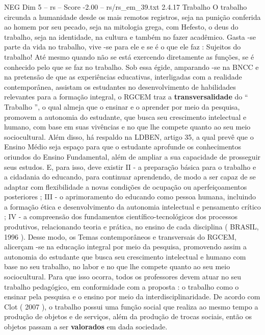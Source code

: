 \begin{textsample}{NEG Dim 5 – rs – Score -2.00 – rs/rs\_em\_39.txt}  \label{ex:f5_neg_023}
2.4.17 Trabalho O trabalho circunda a humanidade desde os mais remotos registros, seja na punição conferida ao homem por seu pecado, seja na mitologia grega, com Hefesto, o deus do trabalho, seja na identidade, na cultura e também no fazer acadêmico.
Gasta -se parte da vida no trabalho, vive -se para ele e se é o que ele faz : Sujeitos do trabalho!
Até mesmo quando não se está exercendo diretamente as funções, se é conhecido pelo que se faz no trabalho.
Sob essa égide, amparando -se na BNCC e na pretensão de que as experiências educativas, interligadas com a realidade contemporânea, assistam os estudantes no desenvolvimento de habilidades relevantes para a formação integral, o RGCEM traz a \textbf{transversalidade} do “ Trabalho ”, o qual almeja que o ensinar e o aprender por meio da pesquisa, promovem a autonomia do estudante, que busca seu crescimento intelectual e humano, com base em suas vivências e no que lhe compete quanto ao seu meio sociocultural.
Além disso, há respaldo na LDBEN, artigo 35, a qual prevê que o Ensino Médio seja espaço para que o estudante aprofunde os conhecimentos oriundos do Ensino Fundamental, além de ampliar a sua capacidade de prosseguir seus estudos.
E, para isso, deve existir II - a preparação básica para o trabalho e a cidadania do educando, para continuar aprendendo, de modo a ser capaz de se adaptar com flexibilidade a novas condições de ocupação ou aperfeiçoamentos posteriores ; III - o aprimoramento do educando como pessoa humana, incluindo a formação ética e desenvolvimento da autonomia intelectual e pensamento crítico ; IV - a compreensão dos fundamentos científico-tecnológicos dos processos produtivos, relacionando teoria e prática, no ensino de cada disciplina ( BRASIL, 1996 ).
Desse modo, os Temas contemporâneos e transversais do RGCEM, alicerçam -se na educação integral por meio da pesquisa, promovendo assim a autonomia do estudante que busca seu crescimento intelectual e humano com base no seu trabalho, no labor e no que lhe compete quanto ao seu meio sociocultural.
Para que isso ocorra, todos os professores devem atuar no seu trabalho pedagógico, em conformidade com a proposta : o trabalho como o ensinar pela pesquisa e o ensino por meio da interdisciplinaridade.
De acordo com Clot ( 2007 ), o trabalho possui uma função social que realiza ao mesmo tempo a produção de objetos e de serviços, além da produção de trocas sociais, então os objetos passam a ser \textbf{valorados} em dada sociedade.

\end{textsample}
